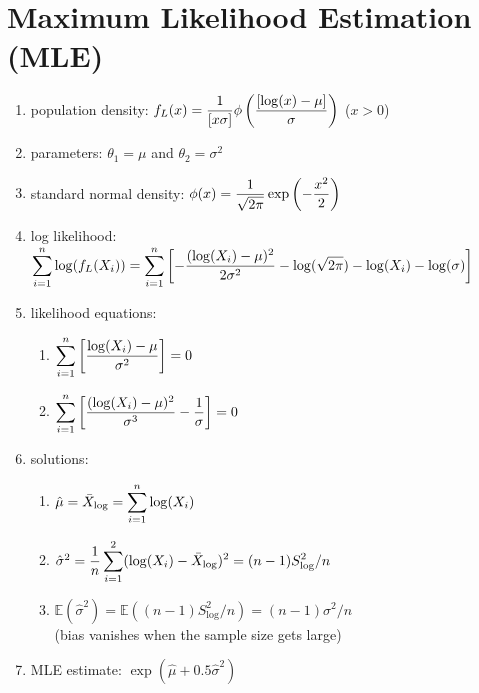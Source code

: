


\section{Maximum Likelihood Estimation (MLE) \cite{ism-1}} \label{Lognormal Distribution: MLE}
\begin{enumerate}[itemsep=0.2cm]
    \item population density: $
        f_L(x) 
        = \dfrac{1}{[x\sigma]} \phi\left(
            \dfrac{[\log(x) - \mu]}{\sigma}
        \right)
    $ \hfill ($x > 0$)

    \item parameters: 
        $\theta_1 = \mu$ 
        and 
        $\theta_2 = \sigma^2$

    \item standard normal density: $
        \phi(x) = \dfrac{1}{\sqrt{2\pi}} \exp\left(-\dfrac{x^2}{2}\right)
    $

    \item log likelihood: $
        \displaystyle\sum_{i=1}^{n} \log(f_L(X_i))
        = \displaystyle\sum_{i=1}^{n} \left[
            -\dfrac{(\log(X_i) - \mu)^2}{2\sigma^2}
            -\log(\sqrt{2\pi})
            -\log(X_i)
            -\log(\sigma)
        \right]
    $
    
    \item likelihood equations: 
    \begin{enumerate}[itemsep=0.2cm]
        \item $
            \displaystyle\sum_{i=1}^{n} \left[\dfrac{\log(X_i) - \mu}{\sigma^2}\right] = 0
        $

        \item $
            \displaystyle\sum_{i=1}^{n} \left[
                \dfrac{(\log(X_i) - \mu)^2}{\sigma^3}
                - \dfrac{1}{\sigma}
            \right] = 0
        $

    \end{enumerate}

    \item solutions:
    \begin{enumerate}[itemsep=0.2cm]
        \item $
            \hat{\mu}
            = \bar{X}_{\log}
            = \displaystyle\sum_{i=1}^n \log(X_i)
        $

        \item $
            \hat{\sigma}^2
            = \dfrac{1}{n} \displaystyle\sum_{i=1}^{2} (\log(X_i) - \bar{X}_{\log})^2 
            = (n-1)S_{\log}^2/n
        $

        \item $
            \mathbb{E}(\hat{\sigma}^2)
            = \mathbb{E}((n-1)S_{\log}^2/n) 
            = (n-1)\sigma^2/n
        $ \\
        (bias vanishes when the sample size gets large)

    \end{enumerate}

    \item MLE estimate: $
        \exp(\hat{\mu} + 0.5\hat{\sigma}^2) 
    $

\end{enumerate}


